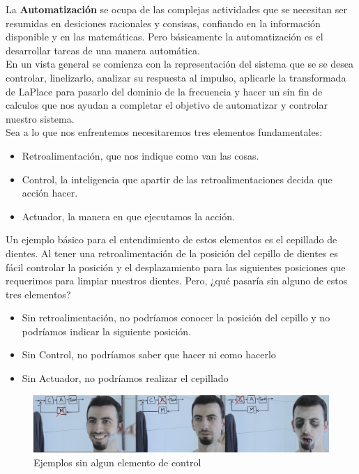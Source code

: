 \documentclass[
	12pt, %
]{fphw}
\begin{document}
La \textbf{Automatización} se ocupa de las complejas actividades que se necesitan ser resumidas en desiciones racionales y consisas, confiando en la información disponible y en las matemáticas. Pero básicamente la automatización es el desarrollar tareas de una manera automática.\\

En un vista general se comienza con la representación del sistema que se se desea controlar, linelizarlo, analizar su respuesta al impulso, aplicarle la transformada de LaPlace para pasarlo del dominio de la frecuencia y hacer un sin fin de calculos que nos ayudan a completar el objetivo de automatizar y controlar nuestro sistema. \\

Sea a lo que nos enfrentemos necesitaremos tres elementos fundamentales:

\begin{itemize}
\item Retroalimentación, que nos indique como van las cosas.
\item Control, la inteligencia que apartir de las retroalimentaciones decida que acción hacer. 
\item Actuador, la manera en que ejecutamos la acción.
\end{itemize}

Un ejemplo básico para el entendimiento de estos elementos es el cepillado de dientes. Al tener una retroalimentación de la posición del cepillo de dientes es fácil controlar la posición y el desplazamiento para las siguientes posiciones que requerimos para limpiar nuestros dientes. Pero, ¿qué pasaría sin alguno de estos tres elementos?

\begin{itemize}
\item Sin retroalimentación, no podríamos conocer la posición del cepillo y no podríamos indicar la siguiente posición. 
\item Sin Control, no podríamos saber que hacer ni como hacerlo  
\item Sin Actuador, no podríamos realizar el cepillado 
\end{itemize}

\begin{figure}[H]
  \centering
  \includegraphics[scale=0.3]{images/ejemplo_control.png}
  \caption{Ejemplos sin algun elemento de control}
\end{figure}
\end{document}
